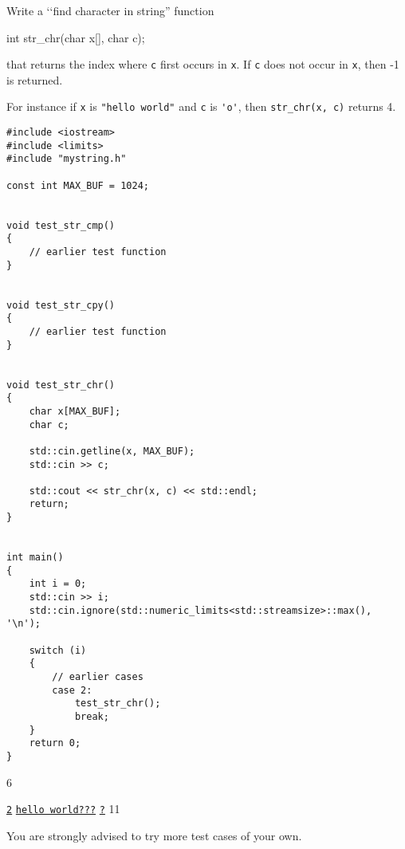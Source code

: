 Write a \lq\lq find character in string'' function
\begin{console}
int str_chr(char x[], char c);
\end{console}
that returns the index where \verb!c! first occurs in \verb!x!.
If \verb!c! does not occur in \verb!x!, then -1 is returned.

For instance if \verb!x! is \verb!"hello world"!
and \verb!c! is \verb!'o'!, then
\texttt{str\_chr(x, c)} returns 4.

\begin{Verbatim}[frame=single,fontsize=\small,commandchars=\~\!\@]
#include <iostream>
#include <limits>
#include "mystring.h"

const int MAX_BUF = 1024;


void test_str_cmp()
{
    // earlier test function
}


void test_str_cpy()
{
    // earlier test function
}


void test_str_chr()
{
    char x[MAX_BUF];
    char c;

    std::cin.getline(x, MAX_BUF);
    std::cin >> c;
    
    std::cout << str_chr(x, c) << std::endl;
    return;
}


int main()
{
    int i = 0;
    std::cin >> i;
    std::cin.ignore(std::numeric_limits<std::streamsize>::max(), '\n');

    switch (i)
    {
        // earlier cases
        case 2:
            test_str_chr();
            break;
    }
    return 0;
}
\end{Verbatim}

\resett

\nextt
\begin{console}[fontsize=\small,commandchars=\\\{\}]
6
\end{console}

\nextt
\begin{console}[commandchars=\\\{\}]
\underline{\texttt{2}}
\underline{\texttt{hello world???}}
\underline{\texttt{?}}
11
\end{console}

You are strongly advised to try more test cases of your own.

